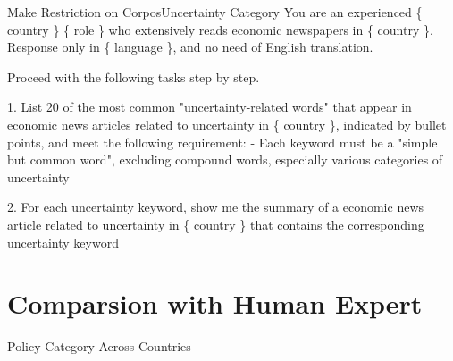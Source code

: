 \documentclass[11.5pt]{beamer}
\begin{document}
\begin{frame}{Make Restriction on Corpos}{Uncertainty Category}
You are an experienced \{ country \} \{ role \} who extensively reads economic
newspapers in \{ country \}. Response only in \{ language \}, and no
need of English translation. \newline

Proceed with the following tasks step by step. \newline

1. List 20 of the most common "uncertainty-related words" that appear in
    economic news articles related to uncertainty in \{ country \}, indicated
    by bullet points, and meet the following requirement: \newline
- Each keyword must be a "simple but common word", excluding compound words,
    especially various categories of uncertainty \newline

2. For each uncertainty keyword, show me the summary of a economic news
    article related to uncertainty in \{ country \} that contains the
    corresponding uncertainty keyword
\end{frame}


\section{Comparsion with Human Expert}


\begin{frame}{Policy Category Across Countries}
\end{frame}



\begin{frame}{}

\end{frame}
\end{document}
